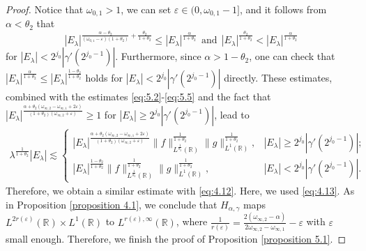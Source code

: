 \documentclass[11pt, twoside, leqno]{article}
\theoremstyle{definition}
\numberwithin{equation}{section}
\begin{document}
\begin{proof}
Notice that $\omega_{0,1}>1$, we can set $\varepsilon\in(0, \omega_{0,1}-1]$, and it follows from $\alpha<\theta_2$ that $$|E_\lambda|^{{\frac{\alpha-\theta_{2}}{(\omega_{0,1}-\varepsilon)(1+\theta_{2})}}+{\frac{\theta_{2}}{1+\theta_{2}}}}\leq|E_\lambda|^{\frac{\alpha}{1+\theta_{2}}} ~~\textrm{and} ~~|E_\lambda|^{\frac{\theta_2}{1+\theta_{2}}}<|E_\lambda|^{\frac{\alpha}{1+\theta_{2}}}$$ for $|E_{\lambda}|<2^{j_0}|\gamma'(2^{j_{0}-1})|$. Furthermore, since $\alpha>1-\theta_2$, one can check that $|E_\lambda|^{\frac{\alpha}{1+\theta_{2}}}\leq |E_\lambda|^{\frac{1-\theta_{2}}{1+\theta_{2}}}$ holds for $|E_{\lambda}|<2^{j_0}|\gamma'(2^{j_{0}-1})|$ directly. These estimates, combined with the estimates \eqref{eq:5.2}-\eqref{eq:5.5} and the fact that $ |E_\lambda|^{\frac{\alpha+\theta_{2}(\omega_{\infty,2}-\omega_{\infty,1}+2\varepsilon)}{(1+\theta_{2})(\omega_{\infty,2}+\varepsilon)}}\geq 1$ for $|E_\lambda|\geq2^{j_0}|\gamma'(2^{j_{0}-1})|$, lead to
\begin{align}\label{eq:5.6}
\lambda^{\frac{1}{1+\theta_2}}|E_{\lambda}|\lesssim
\begin{cases}
   |E_\lambda|^{\frac{\alpha+\theta_{2}(\omega_{\infty,2}-\omega_{\infty,1}+2\varepsilon)}{(1+\theta_{2})(\omega_{\infty,2}+\varepsilon)}}\|f\|^{\frac{1}{1+\theta_2}}_{L^{\frac{1}{\theta_2}}(\mathbb{R})}\|g\|^{\frac{1}{1+\theta_2}}_{L^{1}(\mathbb{R})}, & |E_\lambda|\geq2^{j_0}|\gamma'(2^{j_{0}-1})|; \\
  |E_\lambda|^{\frac{1-\theta_{2}}{1+\theta_{2}}}
\|f\|^{\frac{1}{1+\theta_2}}_{L^{\frac{1}{\theta_2}}(\mathbb{R})}\|g\|^{\frac{1}{1+\theta_2}}_{L^{1}(\mathbb{R})}, &|E_{\lambda}|<2^{j_0}|\gamma'(2^{j_{0}-1})|.
\end{cases}
 \end{align}
Therefore, we obtain a similar estimate with \eqref{eq:4.12}. Here, we used \eqref{eq:4.13}. As in Proposition \ref{proposition 4.1}, we conclude that $H_{\alpha,\gamma}$ maps $L^{2r( \varepsilon )}(\mathbb{R})\times L^{1   }(\mathbb{R})$ to $L^{r(\varepsilon ), \infty}(\mathbb{R})$, where $\frac{1}{r( \varepsilon ) }=\frac{2(\omega_{\infty,2}-\alpha)}{2\omega_{\infty,2}-\omega_{\infty,1}}-\varepsilon $ with $\varepsilon$ small enough. Therefore, we finish the proof of Proposition \ref{proposition 5.1}.\end{proof}
\end{document}
